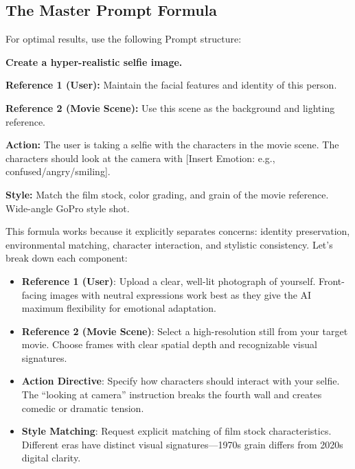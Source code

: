 \subsection{The Master Prompt Formula}

For optimal results, use the following Prompt structure:

\begin{Prompt}
\textbf{Create a hyper-realistic selfie image.}

\textbf{Reference 1 (User):} Maintain the facial features and identity of this person.

\textbf{Reference 2 (Movie Scene):} Use this scene as the background and lighting reference.

\textbf{Action:} The user is taking a selfie with the characters in the movie scene. The characters should look at the camera with [Insert Emotion: e.g., confused/angry/smiling].

\textbf{Style:} Match the film stock, color grading, and grain of the movie reference. Wide-angle GoPro style shot.
\end{Prompt}

This formula works because it explicitly separates concerns: identity preservation, environmental matching, character interaction, and stylistic consistency. Let's break down each component:

\begin{itemize}
\item \textbf{Reference 1 (User)}: Upload a clear, well-lit photograph of yourself. Front-facing images with neutral expressions work best as they give the AI maximum flexibility for emotional adaptation.

\item \textbf{Reference 2 (Movie Scene)}: Select a high-resolution still from your target movie. Choose frames with clear spatial depth and recognizable visual signatures.

\item \textbf{Action Directive}: Specify how characters should interact with your selfie. The ``looking at camera'' instruction breaks the fourth wall and creates comedic or dramatic tension.

\item \textbf{Style Matching}: Request explicit matching of film stock characteristics. Different eras have distinct visual signatures—1970s grain differs from 2020s digital clarity.
\end{itemize}

